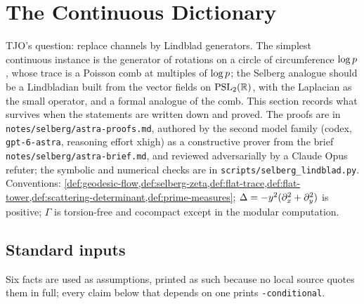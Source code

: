 
\section{The Continuous Dictionary}
\label{sec:selberg}

TJO's question: replace channels by Lindblad generators. The simplest
continuous instance is the generator of rotations on a circle of
circumference $\log p$, whose trace is a Poisson comb at multiples of
$\log p$; the Selberg analogue should be a Lindbladian built from the vector
fields on $\mathrm{PSL}_2(\mathbb R)$, with the Laplacian as the small operator, and a
formal analogue of the comb. This section records what survives when the
statements are written down and proved. The proofs are in
\texttt{notes/selberg/astra-proofs.md}, authored by the second model family
(codex, \texttt{gpt-6-astra}, reasoning effort xhigh) as a constructive
prover from the brief \texttt{notes/selberg/astra-brief.md}, and reviewed
adversarially by a Claude Opus refuter; the symbolic and numerical checks are
in \texttt{scripts/selberg\_lindblad.py}. Conventions:
\cref{def:geodesic-flow,def:selberg-zeta,def:flat-trace,def:flat-tower,def:scattering-determinant,def:prime-measures};
$\Delta = -y^2(\partial_x^2+\partial_y^2)$ is positive; $\Gamma$ is
torsion-free and cocompact except in the modular computation.

\subsection{Standard inputs}

Six facts are used as assumptions, printed as such because no local source
quotes them in full; every claim below that depends on one prints
\texttt{-conditional}.

